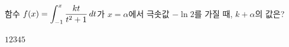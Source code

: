 \hspace*{2mm}\begin{minipage}[t]{\dimexpr\linewidth-2mm\relax}\vspace{0pt}
함수 $f(x)=\displaystyle\int_{-1}^{x}\dfrac{kt}{t^2+1}\mkern3mu dt$가 $x=\alpha$에서 극솟값 $-\ln 2$를 가질 때, $k+\alpha$의 값은? 
\begin{choices32}{$1$}{$2$}{$3$}{$4$}{$5$}\end{choices32}\end{minipage}
